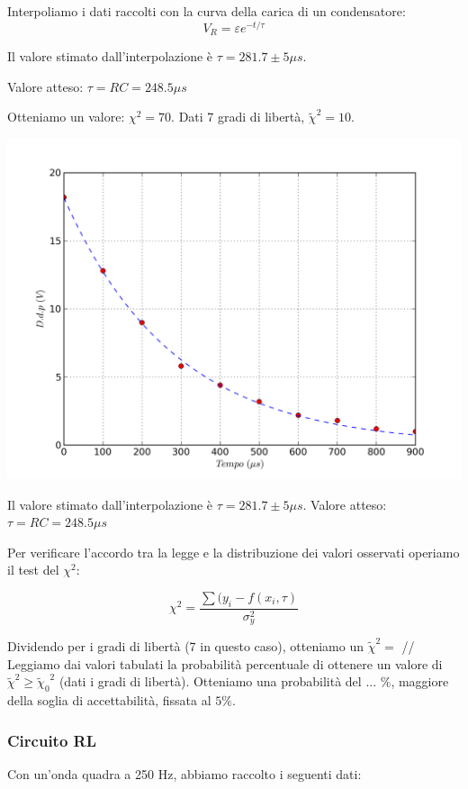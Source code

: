 Interpoliamo i dati raccolti con la curva della carica di un condensatore: 
$$V_R = \varepsilon e^{-t/\tau}$$


Il valore stimato dall'interpolazione è $\tau=281.7 \pm 5 \mu s$.

Valore atteso: $\tau=RC=248.5 \mu s$


Otteniamo un valore: $\chi^2 = 70 $. Dati 7 gradi di libertà, $\tilde{\chi}^2 = 10$.

\begin{center}
 \includegraphics[scale=0.70]{grafici/C3/fitcond.png}
\end{center}

Il valore stimato dall'interpolazione è $\tau=281.7 \pm 5 \mu s$.
Valore atteso: $\tau=RC=248.5 \mu s$

Per verificare l'accordo tra la legge e la distribuzione dei valori osservati operiamo il test del $\chi^2$:

$$ \chi^2 = \frac{\sum{(y_i - f(x_i,\tau )}}{\sigma_y^2} $$

Dividendo per i gradi di libertà (7 in questo caso), otteniamo un $\tilde{\chi}^2 = $ //
Leggiamo dai valori tabulati la probabilità percentuale di ottenere un valore di $\tilde{\chi}^2 \geq {\tilde{\chi}_0}^2 $ (dati i gradi di libertà). Otteniamo una probabilità del ... $\%$, maggiore della soglia di accettabilità, fissata al $5\%$. 


\subsubsection{Circuito RL}
Con un'onda quadra a 250 Hz, abbiamo raccolto i seguenti dati:

